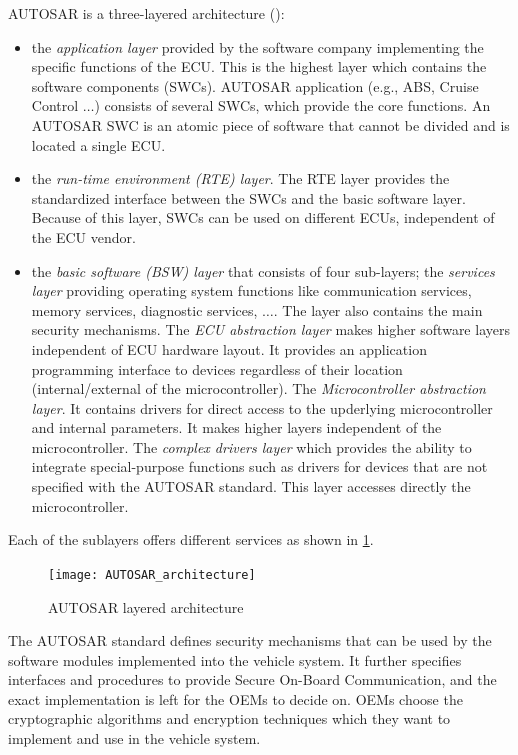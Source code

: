 AUTOSAR is a three-layered architecture (\cite{AUTOSAR_archi}): 
\begin{itemize}
    \item the \emph{application layer} provided by the software company implementing the specific functions of the ECU. This is the highest layer which contains the software components (SWCs). AUTOSAR application (e.g., ABS, Cruise Control $\ldots$) consists of several SWCs, which provide the core functions. An AUTOSAR SWC is an atomic piece of software that cannot be divided and is located a single ECU. 
    \item the \emph{run-time environment (RTE) layer}. The RTE layer provides the standardized interface between the SWCs and the basic software layer. Because of this layer, SWCs can be used on different ECUs, independent of the ECU vendor.
    \item the \emph{basic software (BSW) layer} that consists of four sub-layers; the \emph{services layer} providing operating system functions like communication services, memory services, diagnostic services, $\ldots$. The layer also contains the main security mechanisms. The \emph{ECU abstraction layer} makes higher software layers independent of ECU hardware layout. It provides an application programming interface to devices regardless of their location (internal/external of the microcontroller). The \emph{Microcontroller abstraction layer}. It contains drivers for direct access to the upderlying microcontroller and internal parameters. It makes higher layers independent of the microcontroller. The \emph{complex drivers layer} which provides the ability to integrate special-purpose functions such as drivers for devices that are not specified with the AUTOSAR standard. This layer accesses directly the microcontroller. 
\end{itemize}

Each of the sublayers offers different services as shown in \ref{fig:AUTOSAR_archi}. 

\FloatBarrier
\begin{figure}
    \texttt{[image: AUTOSAR\_architecture]}
    \caption{AUTOSAR layered architecture}
    \label{fig:AUTOSAR_archi}
\end{figure}
\FloatBarrier

The AUTOSAR standard defines security mechanisms that can be used by the software modules implemented into the vehicle system. It further specifies interfaces and procedures to provide Secure On-Board Communication, and the exact implementation is left for the OEMs to decide on. OEMs choose the cryptographic algorithms and encryption techniques which they want to implement and use in the vehicle system.


